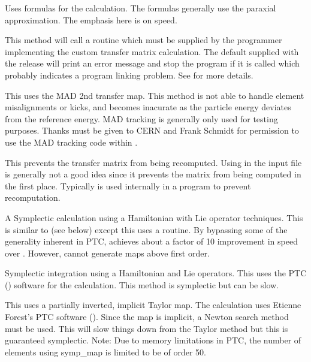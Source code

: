 \begin{description}

\item[\vn{Bmad_Standard}]
Uses formulas for the calculation. The formulas generally use the
paraxial approximation. The emphasis here is on speed.

\item[\vn{Custom}]
This method will call a routine  which must be
supplied by the programmer implementing the custom transfer matrix
calculation. The default  supplied with the
\bmad release will print an error message and stop the program if it
is called which probably indicates a program linking problem.
See  for more details.

\item[\vn{MAD}]
This uses the MAD 2nd transfer map. This method is not able to
handle element misalignments or kicks, and becomes inacurate as the
particle energy deviates from the reference energy. MAD tracking is
generally only used for testing purposes. Thanks must be given
to CERN and Frank Schmidt for permission to use the MAD tracking code
within \bmad.

\item[\vn{Static}]
This prevents the transfer matrix from being recomputed.
Using  in the input file is generally not a good idea since
it prevents the matrix from being computed in the first place.
Typically  is used internally in a program to prevent recomputation.

\item[\vn{Symp_Lie_Bmad}]
A Symplectic calculation using a Hamiltonian with Lie operator
techniques.  This is similar to  (see below) except
this uses a \bmad routine. By bypassing some of the generality
inherent in PTC,  achieves about a factor
of 10 improvement in speed over . However,
 cannot generate maps above first order.

\item[\vn{Symp_Lie_PTC}]
Symplectic integration using a Hamiltonian and Lie operators.
This uses the PTC () software for the calculation.
This method is symplectic but can be slow.

\item[\vn{Symp_Map}]
This uses a partially inverted, implicit Taylor map. The calculation
uses Etienne Forest's PTC software ().  Since the map is implicit, a Newton
search method must be used. This will slow things down from the Taylor
method but this is guaranteed symplectic. Note: Due to memory limitations
in PTC, the number of elements using symp_map is limited to be of order 50.


\end{description}
